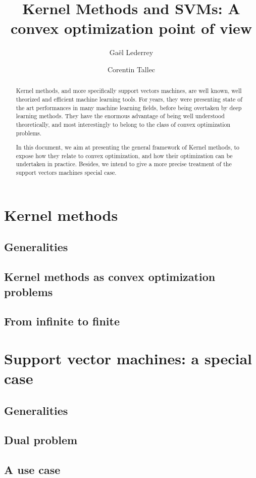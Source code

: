 \documentclass[a4paper, 11pt]{article}
\title{Kernel Methods and SVMs:
A convex optimization point of view}
\author{Gaël Lederrey\\
  \and
Corentin Tallec}
\begin{document}
\maketitle
\begin{abstract}
  Kernel methods, and more specifically support vectors machines, are
  well known, well theorized and efficient machine learning tools. For
  years, they were presenting state of the art performances in many
  machine learning fields, before being overtaken by deep learning
  methods. They have the enormous advantage of being well understood
  theoretically, and most interestingly to belong to the class of
  convex optimization problems.

  In this document, we aim at presenting the general framework of
  Kernel methods, to expose how they relate to convex optimization,
  and how their optimization can be undertaken in practice. Besides,
  we intend to give a more precise treatment of the support vectors
  machines special case.
\end{abstract}
\section{Kernel methods}
\subsection{Generalities}
\subsection{Kernel methods as convex optimization problems}
\subsection{From infinite to finite}
\section{Support vector machines: a special case}
\subsection{Generalities}
\subsection{Dual problem}
\subsection{A use case}
\end{document}
